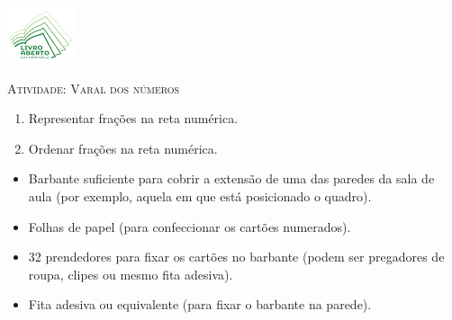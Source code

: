 \documentclass[10 pt,usenames,dvipsnames, oneside]{article}
\begin{document}
\begin{center}
  \begin{minipage}[l]{3cm}
\includegraphics[width=2cm]{../../../Figuras/logo}       
\end{minipage}\hfill
\begin{minipage}[r]{.8\textwidth}
 {\Large \scshape Atividade: Varal dos números}  
\end{minipage}
\end{center}
\vspace{.2cm}

\ifdefined\prof
\begin{goals}
\begin{enumerate}
\item Representar frações na reta numérica. 
\item Ordenar frações na reta numérica.
\end{enumerate}

\tcblower

\begin{itemize} %
  \item     Barbante suficiente para cobrir a extensão de uma das paredes da sala de aula (por exemplo, aquela em que está posicionado o quadro).
  \item  Folhas de papel (para confeccionar os cartões numerados).
  \item  32 prendedores para fixar os cartões no barbante (podem ser pregadores de roupa, clipes ou mesmo fita adesiva).
  \item     Fita adesiva ou equivalente (para fixar o barbante na parede).
\end{itemize} %


\end{goals}
\end{document}
